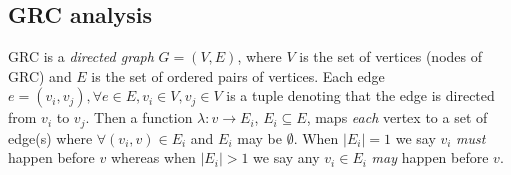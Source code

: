 \subsection{GRC analysis}
\label{sec:agrc-analysis}


GRC is a \textit{directed graph} $G =(V,E)$, where $V$ is the set of
vertices (nodes of GRC) and $E$ is the set of ordered pairs of
vertices. Each edge
$e = (v_i,v_j), \forall e \in E, v_i \in V, v_j \in V$ is a tuple
denoting that the edge is directed from $v_i$ to $v_j$.  Then a 
function $\lambda:v \rightarrow E_i$, $E_i \subseteq E$, maps
\textit{each} vertex to a set of edge(s) where $\forall (v_i,v) \in E_i$
and $E_i$ may be $\emptyset$. When $|E_i| = 1$ we say $v_i$
\textit{must} happen before $v$ whereas when $|E_i| > 1$ we say any
$v_i \in E_i$ \textit{may} happen before $v$.

